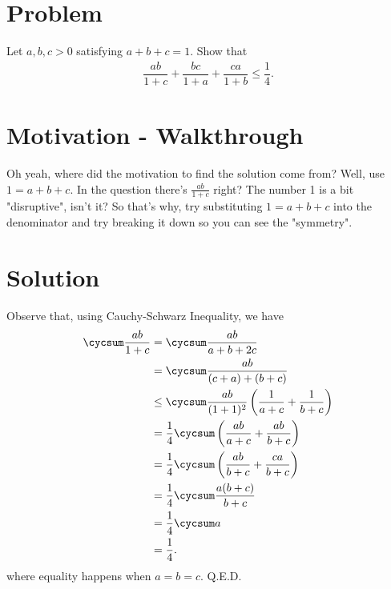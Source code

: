 \section{Problem}
Let $a,b,c > 0$ satisfying $a+b+c=1$. Show that
\begin{align*}
\dfrac{ab}{1+c}+\dfrac{bc}{1+a}+\dfrac{ca}{1+b} \le \dfrac{1}{4}.
\end{align*}

\newpage
\section{Motivation - Walkthrough}
Oh yeah, where did the motivation to find the solution come from? Well, use $1=a+b+c$. In the question there's $\frac{ab}{1+c}$ right? The number 1 is a bit "disruptive", isn't it? So that's why, try substituting $1=a+b+c$ into the denominator and try breaking it down so you can see the "symmetry".

\newpage
\section{Solution}

    Observe that, using Cauchy-Schwarz Inequality, we have
    \begin{align*}
        \cycsum \dfrac{ab}{1+c} &= \cycsum \dfrac{ab}{a+b+2c}\\
        &= \cycsum \dfrac{ab}{(c+a)+(b+c)}\\
        &\le \cycsum \dfrac{ab}{(1+1)^2}\left(\dfrac{1}{a+c} + \dfrac{1}{b+c}\right)\\
        &= \dfrac{1}{4} \cycsum \left(\dfrac{ab}{a+c} + \dfrac{ab}{b+c}\right)\\
        &= \dfrac{1}{4}\cycsum \left(\dfrac{ab}{b+c}+\dfrac{ca}{b+c}\right)\\
        &= \dfrac{1}{4}\cycsum \dfrac{a(b+c)}{b+c}\\
        &= \dfrac{1}{4}\cycsum a\\
        &= \dfrac{1}{4}.
    \end{align*}
    where equality happens when $a=b=c$. Q.E.D.

